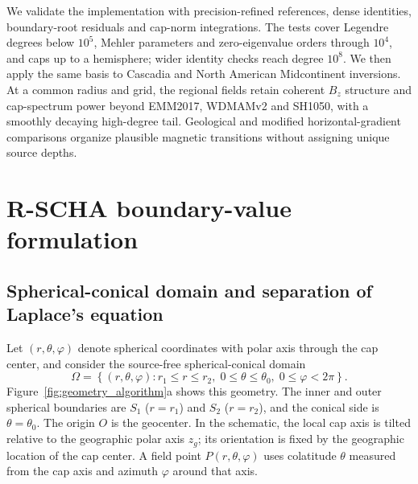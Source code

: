 ﻿\documentclass[11pt,a4paper]{article}
\begin{document}
We validate the implementation with precision-refined references, dense identities, boundary-root residuals and cap-norm integrations. The tests cover Legendre degrees below $10^5$, Mehler parameters and zero-eigenvalue orders through $10^4$, and caps up to a hemisphere; wider identity checks reach degree $10^8$. We then apply the same basis to Cascadia and North American Midcontinent inversions. At a common radius and grid, the regional fields retain coherent $B_z$ structure and cap-spectrum power beyond EMM2017, WDMAMv2 and SH1050, with a smoothly decaying high-degree tail. Geological and modified horizontal-gradient comparisons organize plausible magnetic transitions without assigning unique source depths.

\section{R-SCHA boundary-value formulation}
\label{sec:rscha_framework}

\subsection{Spherical-conical domain and separation of Laplace's equation}

Let $(r,\theta,\varphi)$ denote spherical coordinates with polar axis through the cap center, and consider the source-free spherical-conical domain
\begin{equation}
 \Omega=\left\{(r,\theta,\varphi): r_1\le r\le r_2,\;0\le\theta\le\theta_0,\;0\le\varphi<2\pi\right\}.
 \label{eq:rscha_domain}
\end{equation}
Figure~\ref{fig:geometry_algorithm}a shows this geometry. The inner and outer spherical boundaries are $S_1$ ($r=r_1$) and $S_2$ ($r=r_2$), and the conical side is $\theta=\theta_0$. The origin $O$ is the geocenter. In the schematic, the local cap axis is tilted relative to the geographic polar axis $z_g$; its orientation is fixed by the geographic location of the cap center. A field point $P(r,\theta,\varphi)$ uses colatitude $\theta$ measured from the cap axis and azimuth $\varphi$ around that axis.
\end{document}
